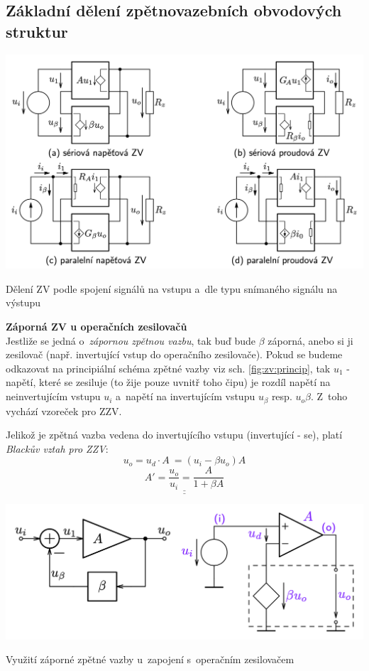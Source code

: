 \documentclass[a4paper,12pt]{article}   %
\begin{document}
\subsection*{Základní dělení zpětnovazebních obvodových struktur}

\begin{schema}[h!]
    \centering
    \includegraphics[width=.8\textwidth]{ZV-obvody.png}
    \caption{Dělení ZV podle spojení signálů na vstupu a~dle typu snímaného signálu na výstupu}
    \label{fig:ZV:deleni}
\end{schema}

\textbf{Záporná ZV u operačních zesilovačů}\\
Jestliže se jedná o~\textit{zápornou zpětnou vazbu}, tak buď bude $\beta$ záporná, anebo si ji  zesilovač (např. invertující vstup do operačního zesilovače). Pokud se budeme odkazovat na principiální schéma zpětné vazby viz sch. \ref{fig:zv:princip}, tak $u_1$ - napětí, které se zesiluje (to žije pouze uvnitř toho čipu) je rozdíl napětí na neinvertujícím vstupu $u_i$ a~napětí na invertujícím vstupu $u_\beta$ resp. $u_o\beta$. Z~toho vychází vzoreček pro ZZV.

Jelikož je zpětná vazba vedena do invertujícího vstupu (invertující -  se), platí \textit{Blackův vztah pro ZZV}:
\begin{equation*}
    u_o = u_d\cdot A~= (u_i -\beta u_o) A
\end{equation*}
\begin{equation}
    \underline{\underline{A' = \frac{u_o}{u_i} = \frac{A}{1+\beta A}}}
    \label{eq:vysledne:zesileni}
\end{equation}

\begin{schema}[h!]
    \centering
    \includegraphics[width=.7\textwidth]{ZZV-OZ.png}
    \caption{Využití záporné zpětné vazby u~zapojení s~operačním zesilovačem}
    \label{fig:opamp:ZZV}
\end{schema}
\end{document}
